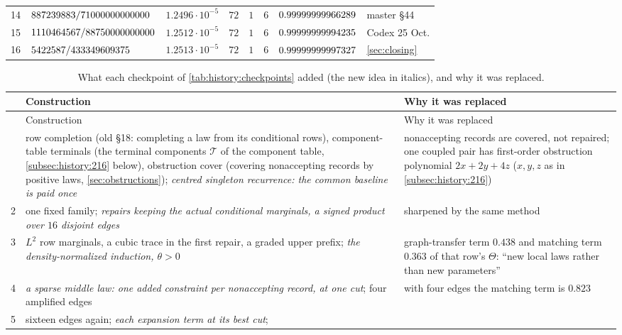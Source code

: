 \begin{table}[ht]
\begin{tabular}{@{}rllrlll l@{}}
14 & {\renewcommand{\frac}[2]{#1/#2}$\FurtherExponent$} & $1.2496\cdot10^{-5}$ & $72$ & $1$ & $6$ & $0.99999999966289$ & master \S44\\
15 & {\renewcommand{\frac}[2]{#1/#2}$\CodexExponent$} & $1.2512\cdot10^{-5}$ & $72$ & $1$ & $6$ & $0.99999999994235$ & Codex 25 Oct.\\
16 & {\renewcommand{\frac}[2]{#1/#2}$\PushExponent$} & $1.2513\cdot10^{-5}$ & $72$ & $1$ & $6$ & $0.99999999997327$ & \cref{sec:closing}\\
\bottomrule
\end{tabular}
\end{table}

{\footnotesize
\begin{longtable}{@{}r>{\raggedright\arraybackslash}p{}>{\raggedright\arraybackslash}p{}@{}}
\caption{What each checkpoint of \cref{tab:history:checkpoints} added (the
new idea in italics), and why it was replaced.}
\label{tab:history:ideas}\\
\toprule
 & Construction & Why it was replaced\\
\midrule
\endfirsthead
\toprule
 & Construction & Why it was replaced\\
\midrule
\endhead
\bottomrule
\endfoot
1 & row completion (old \S18: completing a law from its conditional rows), component-table terminals (the terminal components $\mathcal T$ of the component table, \cref{subsec:history:216} below), obstruction cover (covering nonaccepting records by positive laws, \cref{sec:obstructions});
 \emph{centred singleton recurrence: the common baseline is paid once} &
 nonaccepting records are covered, not repaired; one coupled pair has first-order obstruction polynomial $2x+2y+4z$ ($x,y,z$ as in \cref{subsec:history:216})\\
2 & one fixed family; \emph{repairs keeping the actual conditional marginals,
 a signed product over $16$ disjoint edges} & sharpened by the same method\\
3 & $L^2$ row marginals, a cubic trace in the first repair, a graded upper
 prefix; \emph{the density-normalized induction, $\theta>0$} &
 graph-transfer term $0.438$ and matching term $0.363$ of that row's $\Theta$: ``new local laws rather than new
 parameters''\\
4 & \emph{a sparse middle law: one added constraint per nonaccepting record, at
 one cut}; four amplified edges & with four edges the matching term is
 $0.823$\\
5 & sixteen edges again; \emph{each expansion term at its best cut};

\end{longtable}}
